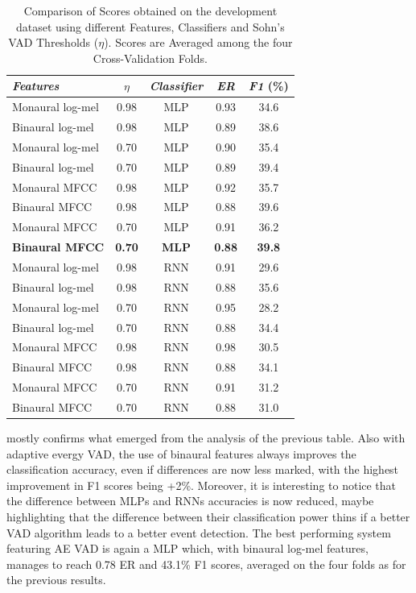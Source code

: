 \begin{table}[h]
	\centering
	\begin{tabular}{l c c c c}\toprule
		\emph{Features} & \emph{$\eta$} & \emph{Classifier} & \emph{ER} & \emph{F1} (\%)\\
		\midrule
		Monaural log-mel & 0.98 & MLP & 0.93 & 34.6\\
		Binaural log-mel & 0.98 & MLP & 0.89 & 38.6\\
		\midrule
		Monaural log-mel & 0.70 & MLP & 0.90 & 35.4\\
		Binaural log-mel & 0.70 & MLP & 0.89 & 39.4\\
		\midrule
		Monaural MFCC & 0.98 & MLP & 0.92 & 35.7\\
		Binaural MFCC & 0.98 & MLP & 0.88 & 39.6\\
		\midrule
		Monaural MFCC & 0.70 & MLP & 0.91 & 36.2\\
		\textbf{Binaural MFCC} & \textbf{0.70} & \textbf{MLP} & \textbf{0.88} & \textbf{39.8}\\
		\midrule
		Monaural log-mel & 0.98 & RNN & 0.91 & 29.6\\
		Binaural log-mel & 0.98 & RNN & 0.88 & 35.6\\
		\midrule
		Monaural log-mel & 0.70 & RNN & 0.95 & 28.2\\
		Binaural log-mel & 0.70 & RNN & 0.88 & 34.4\\
		\midrule
		Monaural MFCC & 0.98 & RNN & 0.98 & 30.5\\
		Binaural MFCC & 0.98 & RNN & 0.88 & 34.1\\
		\midrule
		Monaural MFCC & 0.70 & RNN & 0.91 & 31.2\\
		Binaural MFCC & 0.70 & RNN & 0.88 & 31.0\\
		\bottomrule
	\end{tabular}
	\caption[Sound Event Detection - DCASE 2016 - Experiments]{Comparison of Scores obtained on the development dataset using different Features, Classifiers and Sohn's VAD Thresholds ($\eta$). Scores are Averaged among the four Cross-Validation Folds.}
	\label{tab:dev_results_sohn}
\end{table}

 mostly confirms what emerged from the analysis of the previous table. Also with adaptive evergy VAD, the use of binaural features always improves the classification accuracy, even if differences are now less marked, with the highest improvement in F1 scores being +2\%. Moreover, it is interesting to notice that the difference between MLPs and RNNs accuracies is now reduced, maybe highlighting that the difference between their classification power thins if a better VAD algorithm leads to a better event detection. The best performing system featuring AE VAD is again a MLP which, with binaural log-mel features, manages to reach 0.78 ER and 43.1\% F1 scores, averaged on the four folds as for the previous results.

